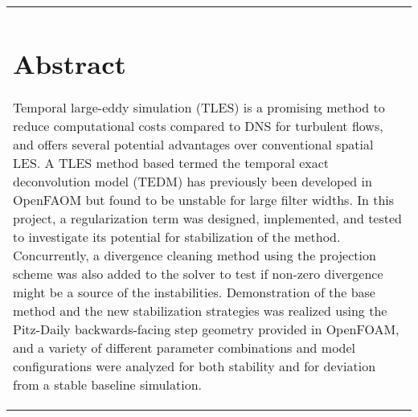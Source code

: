 \begin{tabular}{p{}}
\chapter*{Abstract}

Temporal large-eddy simulation (TLES) is a promising method to reduce computational costs compared to DNS for turbulent flows, and offers several potential advantages over conventional spatial LES. A TLES method based termed the temporal exact deconvolution model (TEDM) has previously been developed in OpenFAOM but found to be unstable for large filter widths. In this project, a regularization term was designed, implemented, and tested to investigate its potential for stabilization of the method. Concurrently, a divergence cleaning method using the projection scheme was also added to the solver to test if non-zero divergence might be a source of the instabilities. Demonstration of the base method and the new stabilization strategies was realized using the Pitz-Daily backwards-facing step geometry provided in OpenFOAM, and a variety of different parameter combinations and model configurations were analyzed for both stability and for deviation from a stable baseline simulation.

\end{tabular}
